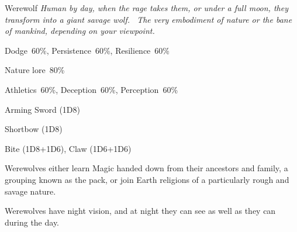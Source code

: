 \begin{monsterbox}{Werewolf}
	\textit{Human by day, when the rage takes them, or under a full moon, they transform into a giant savage wolf.  The very embodiment of nature or the bane of mankind, depending on your viewpoint.}\\
	\rpghline
	\basics[%
        hitpoints  = 12, 
	majorwound = 6,
	damagemodifier = +1D6 (wolf),
	powerpoints = 11,
	movementrate = {15m (man), 30m (wolf)},
	armor = Hide (1AP),
	plunderrating = 0
	]
	\rpghline%
	\stats[ %
		STR = 3D6/6D6  (11/22),
		CON = 3D6      (11),
		DEX = 3D6      (11),
		SIZ = 2D6+6    (13),
		INT = 2D6+6/1D6+3 (13/6),
		POW = 3D6      (11),
		CHA = 3D6      (11)
	]
	\rpghline%
	\begin{rpg-monsteraction}[Resistances]
		Dodge~60\%, Persistence~60\%, Resilience~60\%
	\end{rpg-monsteraction}
	\begin{rpg-monsteraction}[Knowledge]
    		Nature lore~80\%
	\end{rpg-monsteraction}
	\begin{rpg-monsteraction}[Practical]
		Athletics~60\%, Deception~60\%, Perception~60\%
	\end{rpg-monsteraction}
	\begin{rpg-monsteraction}
		Arming Sword (1D8)
	\end{rpg-monsteraction}
	\begin{rpg-monsteraction}
		Shortbow (1D8)
	\end{rpg-monsteraction}
	\begin{rpg-monsteraction}
		Bite (1D8+1D6), Claw (1D6+1D6)
	\end{rpg-monsteraction}
	\begin{rpg-monsteraction}[Magic]
		Werewolves either learn Magic handed down from their ancestors and family, a grouping known as the pack, or join Earth religions of a particularly rough and savage nature.
	\end{rpg-monsteraction}
	\begin{rpg-monsteraction}
		Werewolves have night vision, and at night they can see as well as they can during the day.
	\end{rpg-monsteraction}

\end{monsterbox}
